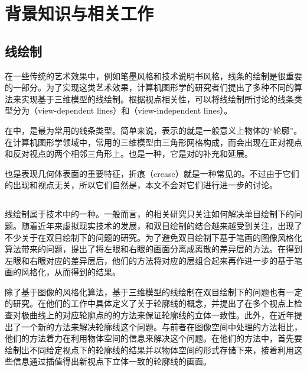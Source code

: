 \chapter{背景知识与相关工作}

\section{线绘制}

在一些传统的艺术效果中，例如笔墨风格和技术说明书风格，线条的绘制是很重要的一部分。为了实现这类艺术效果，计算机图形学的研究者们提出了多种不同的算法来实现基于三维模型的线绘制。根据视点相关性，可以将线绘制所讨论的线条类型分为\vdl{}（view-dependent lines）和\vidl{}（view-independent lines）。

在\vdl{}中，\con{}是最为常用的线条类型。简单来说，\con{}表示的就是一般意义上物体的“轮廓”。在计算机图形学领域中，常用的三维模型由三角形网格构成，而\con{}会出现在正对视点和反对视点的两个相邻三角形上。\scon{}也是一种\vdl{}，它是对\con{}的补充和延展。

\vidl{}也是表现几何体表面的重要特征，折痕（crease）就是一种常见的\vidl{}。不过由于它们的出现和视点无关，所以它们自然是\stc{}，本文不会对它们进行进一步的讨论。

\section{\stc{}\npr{}}

线绘制属于\npr{}技术中的一种。一般而言，\npr{}的相关研究只关注如何解决单目绘制下的问题。随着近年来虚拟现实技术的发展，\npr{}和双目绘制的结合越来越受到关注，出现了不少关于\npr{}在双目绘制下的问题的研究。为了避免双目绘制下基于笔画的图像风格化算法\cite{hertzmann1998painterly}带来的问题，\citeauthor{northam2012consistent}\cite{northam2012consistent,northam2013stereoscopic}提出了将左眼和右眼的画面分离成离散的差异层的方法。在得到左眼和右眼对应的差异层后，他们的方法将对应的层组合起来再作进一步的基于笔画的风格化，从而得到\stc{}的结果。

除了基于图像的风格化算法，基于三维模型的线绘制在双目绘制下的问题也有一定的研究。\citeauthor{kim2013stereoscopic}在他们的工作中具体定义了关于轮廓线的\stc{}概念，并提出了在多个视点上检查对极曲线上的对应轮廓点的的方法来保证轮廓线的立体一致性。此外，\citeauthor{bukenberger2018stereo}在近年提出了一个新的方法\cite{bukenberger2018stereo}来解决\stc{}轮廓线这个问题。与前者在图像空间中处理的方法相比，他们的方法着力在利用物体空间的信息来解决这个问题。在他们的方法中，首先要绘制出不同给定视点下的轮廓线的结果并以物体空间的形式存储下来，接着利用这些信息通过插值得出新视点下立体一致的轮廓线的画面。

